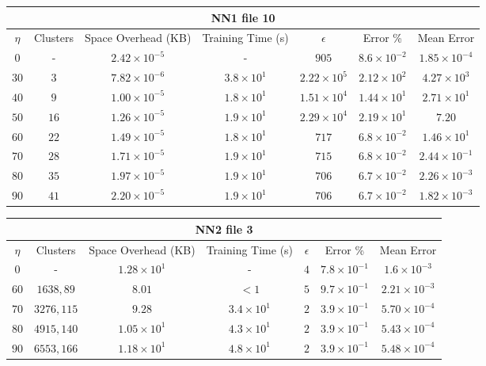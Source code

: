 \begin{adjustwidth}{-1cm}{}
\begin{tabular}{ccccccc}
\hline
\multicolumn{7}{c}{NN1 file 10} \\
\toprule
$\eta$ & Clusters & Space Overhead (KB) & Training Time (s) & $\epsilon$ & Error \% & Mean Error\\
\midrule
$0$ & - & $2.42 \times 10^{-5}$ & - & $905$ & $8.6 \times 10^{-2}$ & $1.85 \times 10^{-4}$\\
$30$ & $3$ & $7.82 \times 10^{-6}$ & $3.8 \times 10^1$ & $2.22 \times 10^5$ & $2.12 \times 10^2$ & $4.27 \times 10^3$\\
$40$ & $9$ & $1.00 \times 10^{-5}$ & $1.8 \times 10^1$ & $1.51 \times 10^4$ & $1.44 \times 10^1$ & $2.71 \times 10^1$\\
$50$ & $16$ & $1.26 \times 10^{-5}$ & $1.9 \times 10^1$ & $2.29 \times 10^4$ & $2.19 \times 10^1$ & $7.20$\\
$60$ & $22$ & $1.49 \times 10^{-5}$ & $1.8 \times 10^1$ & $717$ & $6.8 \times 10^{-2}$ & $1.46 \times 10^1$\\
$70$ & $28$ & $1.71 \times 10^{-5}$ & $1.9 \times 10^1$ & $715$ & $6.8 \times 10^{-2}$ & $2.44 \times 10^{-1}$\\
$80$ & $35$ & $1.97 \times 10^{-5}$ & $1.9 \times 10^1$ & $706$ & $6.7 \times 10^{-2}$ & $2.26 \times 10^{-3}$\\
$90$ & $41$ & $2.20 \times 10^{-5}$ & $1.9 \times 10^1$ & $706$ & $6.7 \times 10^{-2}$ & $1.82 \times 10^{-3}$\\
\bottomrule
\end{tabular}
\end{adjustwidth}

\par\null\par
\par\null\par

\begin{adjustwidth}{-1cm}{}
\begin{tabular}{ccccccc}
\hline
\multicolumn{7}{c}{NN2 file 3} \\
\toprule
$\eta$ & Clusters & Space Overhead (KB) & Training Time (s) & $\epsilon$ & Error \% & Mean Error\\
\midrule
$0$ & - & $1.28 \times 10^{1}$ & - & $4$ & $7.8 \times 10^{-1}$ & $1.6 \times 10^{-3}$\\
$60$ & $1638, 89$ & $8.01$ & $<1$ & $5$ & $9.7 \times 10^{-1}$ & $2.21 \times 10^{-3}$\\
$70$ & $3276, 115$ & $9.28$ & $3.4 \times 10^1$ & $2$ & $3.9 \times 10^{-1}$ & $5.70 \times 10^{-4}$\\
$80$ & $4915, 140$ & $1.05 \times 10^1$ & $4.3 \times 10^1$ & $2$ & $3.9 \times 10^{-1}$ & $5.43 \times 10^{-4}$\\
$90$ & $6553, 166$ & $1.18 \times 10^1$ & $4.8 \times 10^1$ & $2$ & $3.9 \times 10^{-1}$ & $5.48 \times 10^{-4}$\\
\bottomrule
\end{tabular}
\end{adjustwidth}

